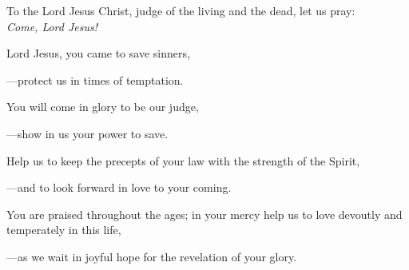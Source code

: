\intercessions\indent

\begin{hangpar}

To the Lord Jesus Christ, judge of the living and the dead, let us pray:\\
\emph{Come, Lord Jesus!}

\medskip Lord Jesus, you came to save sinners,

{\color{red}---\thinspace}protect us in times of temptation.

\medskip You will come in glory to be our judge,

{\color{red}---\thinspace}show in us your power to save.

\medskip Help us to keep the precepts of your law with the strength of the Spirit,

{\color{red}---\thinspace}and to look forward in love to your coming.

\medskip You are praised throughout the ages; in your mercy help us to love devoutly and temperately in this life,

{\color{red}---\thinspace}as we wait in joyful hope for the revelation of your glory.

\end{hangpar}